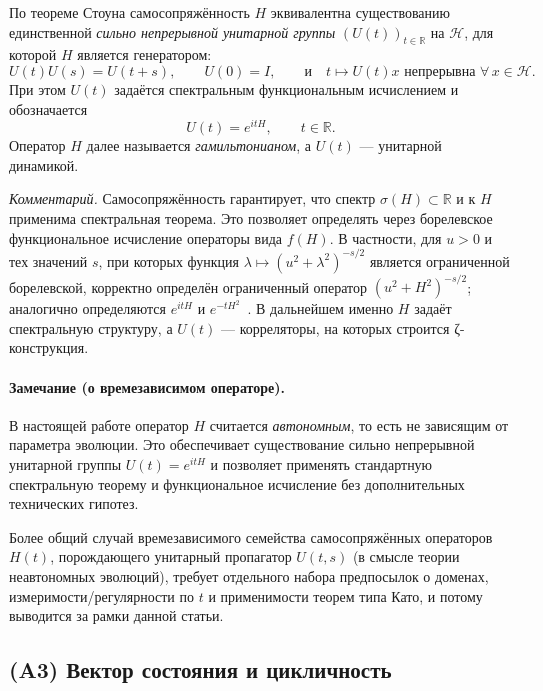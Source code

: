 \documentclass{article}
\numberwithin{equation}{section}
\theoremstyle{plain}
\theoremstyle{definition}
\theoremstyle{remark}
\begin{document}
По теореме Стоуна самосопряжённость $H$ эквивалентна существованию единственной
\emph{сильно непрерывной унитарной группы} $(U(t))_{t\in\mathbb R}$ на $\mathcal H$,
для которой $H$ является генератором:
\begin{equation}
U(t)U(s)=U(t+s),\qquad U(0)=I,\qquad
\text{и}\quad t\mapsto U(t)x \text{ непрерывна } \forall\,x\in\mathcal H .
\end{equation}
При этом $U(t)$ задаётся спектральным функциональным исчислением и обозначается
\begin{equation}
U(t)=e^{itH},\qquad t\in\mathbb R.
\end{equation}
Оператор $H$ далее называется \emph{гамильтонианом}, а $U(t)$ — унитарной динамикой.

\emph{Комментарий.}
Самосопряжённость гарантирует, что спектр $\sigma(H)\subset\mathbb R$ и к $H$ применима спектральная теорема.
Это позволяет определять через борелевское функциональное исчисление операторы вида $f(H)$.
В частности, для $u>0$ и тех значений $s$, при которых функция
$\lambda\mapsto (u^2+\lambda^2)^{-s/2}$ является ограниченной борелевской,
корректно определён ограниченный оператор $(u^2+H^2)^{-s/2}$; аналогично определяются $e^{itH}$ и $e^{-tH^2}$~\cite{ReedSimonII}.
В дальнейшем именно $H$ задаёт спектральную структуру, а $U(t)$ — корреляторы, на которых строится ζ-конструкция.

\paragraph{Замечание (о времезависимом операторе).}
В настоящей работе оператор $H$ считается \emph{автономным}, то есть не зависящим от параметра эволюции.
Это обеспечивает существование сильно непрерывной унитарной группы $U(t)=e^{itH}$ и позволяет применять стандартную
спектральную теорему и функциональное исчисление без дополнительных технических гипотез.

Более общий случай времезависимого семейства самосопряжённых операторов $H(t)$, порождающего унитарный пропагатор
$U(t,s)$ (в смысле теории неавтономных эволюций), требует отдельного набора предпосылок о доменах,
измеримости/регулярности по $t$ и применимости теорем типа Като, и потому выводится за рамки данной статьи.


\subsection{(A3) Вектор состояния и цикличность}
\end{document}
